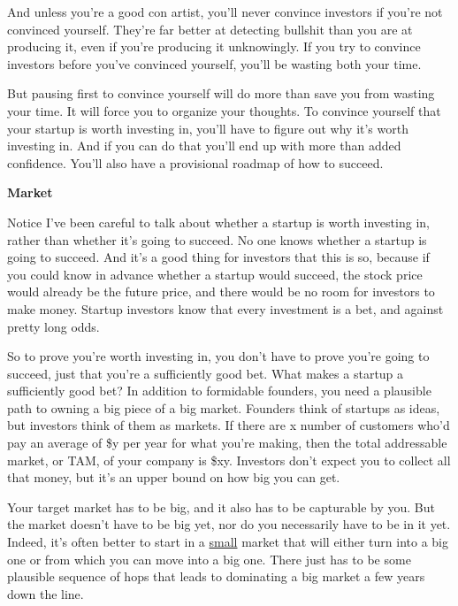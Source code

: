 And unless you're a good con artist, you'll never convince investors if
you're not convinced yourself. They're far better at detecting bullshit
than you are at producing it, even if you're producing it unknowingly.
If you try to convince investors before you've convinced yourself,
you'll be wasting both your time.

But pausing first to convince yourself will do more than save you from
wasting your time. It will force you to organize your thoughts. To
convince yourself that your startup is worth investing in, you'll have
to figure out why it's worth investing in. And if you can do that you'll
end up with more than added confidence. You'll also have a provisional
roadmap of how to succeed.

\textbf{Market}

Notice I've been careful to talk about whether a startup is worth
investing in, rather than whether it's going to succeed. No one knows
whether a startup is going to succeed. And it's a good thing for
investors that this is so, because if you could know in advance whether
a startup would succeed, the stock price would already be the future
price, and there would be no room for investors to make money. Startup
investors know that every investment is a bet, and against pretty long
odds.

So to prove you're worth investing in, you don't have to prove you're
going to succeed, just that you're a sufficiently good bet. What makes a
startup a sufficiently good bet? In addition to formidable founders, you
need a plausible path to owning a big piece of a big market. Founders
think of startups as ideas, but investors think of them as markets. If
there are x number of customers who'd pay an average of \$y per year for
what you're making, then the total addressable market, or TAM, of your
company is \$xy. Investors don't expect you to collect all that money,
but it's an upper bound on how big you can get.

Your target market has to be big, and it also has to be capturable by
you. But the market doesn't have to be big yet, nor do you necessarily
have to be in it yet. Indeed, it's often better to start in a
\href{ds.html}{small} market that will either turn into a big one or
from which you can move into a big one. There just has to be some
plausible sequence of hops that leads to dominating a big market a few
years down the line.

